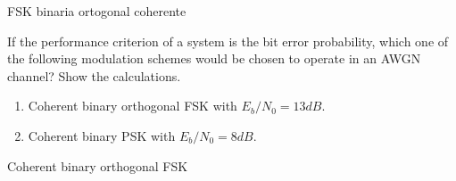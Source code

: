 \documentclass[idioma,boletin]{uah}
\begin{document}
\newpage

{

FSK binaria ortogonal coherente
}
{

If the performance criterion of a system is the bit error probability, which one of the following modulation schemes would be chosen to operate in an AWGN channel? Show the calculations.

\begin{enumerate}
	\item Coherent binary orthogonal FSK with $E_b/N_0 = 13 dB$.
	\item Coherent binary PSK with $E_b/N_0 = 8 dB$.
\end{enumerate}

}
{

Coherent binary orthogonal FSK
}
\end{document}
